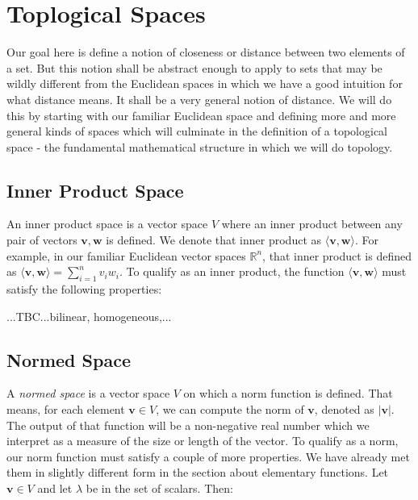 \section{Toplogical Spaces}
Our goal here is define a notion of closeness or distance between two elements of a set. But this notion shall be abstract enough to apply to sets that may be wildly different from the Euclidean spaces in which we have a good intuition for what distance means. It shall be a very general notion of distance. We will do this by starting with our familiar Euclidean space and defining more and more general kinds of spaces which will culminate in the definition of a topological space - the fundamental mathematical structure in which we will do topology.

\subsection{Inner Product Space}
An inner product space is a vector space $V$ where an inner product between any pair of vectors $\mathbf{v,w}$ is defined. We denote that inner product as $\langle \mathbf{v,w} \rangle$. For example, in our familiar Euclidean vector spaces $\mathbb{R}^n$, that inner product is defined as $\langle \mathbf{v,w} \rangle = \sum_{i=1}^n v_i w_i$. To qualify as an inner product, the function $\langle \mathbf{v,w} \rangle$ must satisfy the following properties:




...TBC...bilinear, homogeneous,...






\subsection{Normed Space}
A \emph{normed space} is a vector space $V$ on which a norm function is defined. That means, for each element $\mathbf{v} \in V$, we can compute the norm of $\mathbf{v}$, denoted as $|\mathbf{v}|$. The output of that function will be a non-negative real number which we interpret as a measure of the size or length of the vector. To qualify as a norm, our norm function must satisfy a couple of more properties. We have already met them in slightly different form in the section about elementary functions. Let $\mathbf{v} \in V$ and let $\lambda$ be in the set of scalars. Then:

